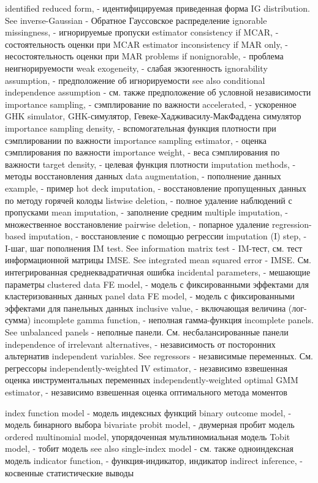 identified reduced form, - идентифицируемая приведенная форма
IG distribution. See inverse-Gaussian - Обратное Гауссовское распределение
ignorable missingness, - игнорируемые пропуски
estimator consistency if MCAR, - состоятельность оценки при MCAR
estimator inconsistency if MAR only, - несостоятельность оценки при MAR
problems if nonignorable, - проблема неигнорируемости
weak exogeneity, - слабая экзогенность
ignorability assumption, - предположение об игнорируемости
see also conditional independence assumption - см. также предположение об условной независимости
importance sampling, - сэмплирование по важности
accelerated, - ускоренное
GHK simulator, GHK-симулятор, Гевеке-Хадживасилу-МакФаддена симулятор
importance sampling density, - вспомогательная функция плотности при сэмплировании по важности
importance sampling estimator, - оценка сэмплирования по важности
importance weight, - веса сэмплирования по важности
target density, - целевая функция плотности
imputation methods, - методы восстановления данных
data augmentation, - пополнение данных
example, - пример
hot deck imputation, - восстановление пропущенных данных по методу горячей колоды
listwise deletion, - полное удаление наблюдений с пропусками
mean imputation, - заполнение средним
multiple imputation, - множественное восстановление
pairwise deletion, - попарное удаление
regression-based imputation, - восстановление с помощью регрессии
imputation (I) step, - I-шаг, шаг пополнения
IM test. See information matrix test - IM-тест, см. тест информационной матрицы
IMSE. See integrated mean squared error - IMSE. См. интегрированная среднеквадратичная ошибка
incidental parameters, - мешающие параметры
clustered data FE model, - модель с фиксированными эффектами для кластеризованных данных
panel data FE model, - модель с фиксированными эффектами для панельных данных
inclusive value, - включающая величина (лог-сумма)
incomplete gamma function, - неполная гамма-функция
incomplete panels. See unbalanced panels  - неполные панели. См. несбалансированные панели
independence of irrelevant alternatives, - независимость от посторонних альтернатив
independent variables. See regressors - независимые переменных. См. регрессоры
independently-weighted IV estimator, - независимо взвешенная оценка инструментальных переменных
independently-weighted optimal GMM estimator, - независимо взвешенная оценка оптимального метода моментов

index function model - модель индексных функций
binary outcome model, - модель бинарного выбора
bivariate probit model, - двумерная пробит модель  
ordered multinomial model, упорядоченная мультиномиальная модель
Tobit model, - тобит модель
see also single-index model - см. также одноиндексная модель
indicator function, - функция-индикатор, индикатор
indirect inference, - косвенные статистические выводы

